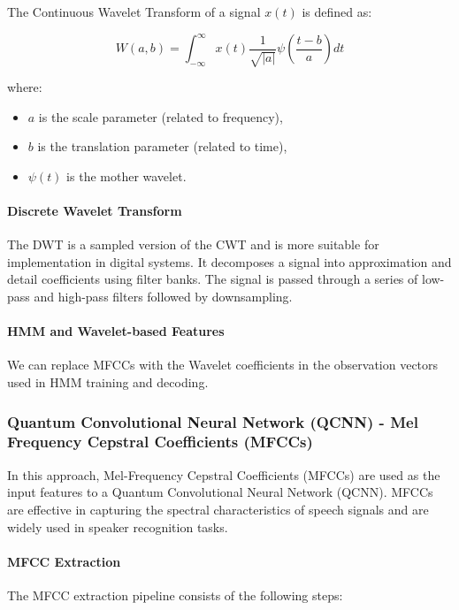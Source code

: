 \documentclass[conference]{IEEEtran}
\begin{document}
The Continuous Wavelet Transform of a signal $x(t)$ is defined as:

\[
    W(a, b) = \int_{-\infty}^{\infty} x(t) \frac{1}{\sqrt{|a|}} \psi\left(\frac{t - b}{a} \right) dt
\]

where:
\begin{itemize}
    \item $a$ is the scale parameter (related to frequency),
    \item $b$ is the translation parameter (related to time),
    \item $\psi(t)$ is the mother wavelet.
\end{itemize}

\paragraph{Discrete Wavelet Transform}
The DWT is a sampled version of the CWT and is more suitable for implementation in digital systems. It decomposes a signal into approximation and detail coefficients using filter banks. The signal is passed through a series of low-pass and high-pass filters followed by downsampling. \cite{tufekci2000dwt}

\paragraph{HMM and Wavelet-based Features}
We can replace MFCCs with the Wavelet coefficients in the observation vectors used in HMM training and decoding.


\subsubsection{Quantum Convolutional Neural Network (QCNN) - Mel Frequency Cepstral Coefficients (MFCCs)}

In this approach, Mel-Frequency Cepstral Coefficients (MFCCs) are used as the input features to a Quantum Convolutional Neural Network (QCNN). MFCCs are effective in capturing the spectral characteristics of speech signals and are widely used in speaker recognition tasks.

\paragraph{MFCC Extraction}

The MFCC extraction pipeline consists of the following steps:
\end{document}
